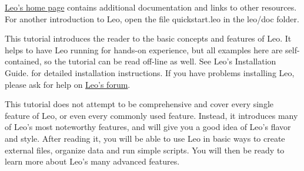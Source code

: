\documentclass[a4paper,10pt,english]{sphinxmanual}
\begin{document}
\href{http://webpages.charter.net/edreamleo/front.html}{Leo's home page} contains additional documentation and links to other
resources. For another introduction to Leo, open the file quickstart.leo in the
leo/doc folder.

This tutorial introduces the reader to the basic concepts and features of Leo.
It helps to have Leo running for hands-on experience, but all examples here are
self-contained, so the tutorial can be read off-line as well.
See Leo's Installation Guide. for detailed installation instructions. If you
have problems installing Leo, please ask for help on \href{http://groups.google.com/group/leo-editor}{Leo's forum}.

This tutorial does not attempt to be comprehensive and cover every single
feature of Leo, or even every commonly used feature. Instead, it introduces many
of Leo's most noteworthy features, and will give you a good idea of Leo's flavor
and style. After reading it, you will be able to use Leo in basic ways to create
external files, organize data and run simple scripts. You will then be ready to
learn more about Leo's many advanced features.
\end{document}
